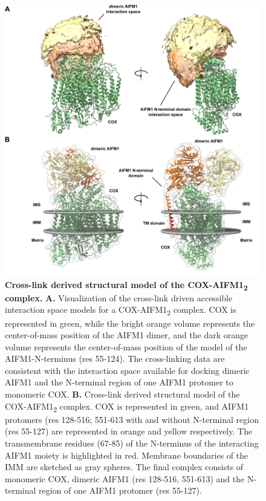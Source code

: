 \begin{figure}[p]
	\center
	\includegraphics[]{Chapter.3/Figures/Figure3.png}
	\caption{\textbf{Cross-link derived structural model of the COX-AIFM1\textsubscript{2} complex.} \textbf{A.} Visualization of the cross-link driven accessible interaction space models for a COX-AIFM1\textsubscript{2} complex. COX is represented in green, while the bright orange volume represents the center-of-mass position of the AIFM1 dimer, and the dark orange volume represents the center-of-mass position of the model of the AIFM1-N-terminus (res 55-124). The cross-linking data are consistent with the interaction space available for docking dimeric AIFM1 and the N-terminal region of one AIFM1 protomer to monomeric COX. \textbf{B.} Cross-link derived structural model of the COX-AIFM1\textsubscript{2} complex. COX is represented in green, and AIFM1 protomers (res 128-516; 551-613 with and without N-terminal region (res 55-127) are represented in orange and yellow respectively. The transmembrane residues (67-85) of the N-terminus of the interacting AIFM1 moiety is highlighted in red. Membrane boundaries of the IMM are sketched as gray spheres. The final complex consists of monomeric COX, dimeric AIFM1 (res 128-516, 551-613) and the N-terminal region of one AIFM1 protomer (res 55-127).}
	\label{fig:ch3_fig3}
\end{figure}
